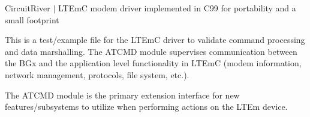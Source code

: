 Circuit\+River $\vert$ LTEmC modem driver implemented in C99 for portability and a small footprint

This is a test/example file for the LTEmC driver to validate command processing and data marshalling. The ATCMD module supervises communication between the BGx and the application level functionality in LTEmC (modem information, network management, protocols, file system, etc.).

The ATCMD module is the primary extension interface for new features/subsystems to utilize when performing actions on the LTEm device. 